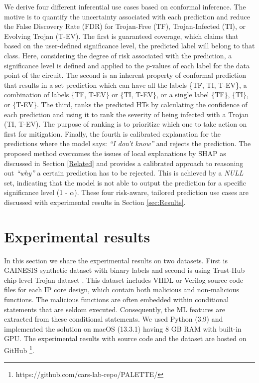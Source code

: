  We derive four different inferential use cases based on conformal inference. The motive is to quantify the uncertainty associated with each prediction and reduce the False Discovery Rate (FDR) for Trojan-Free (TF), Trojan-Infected (TI), or Evolving Trojan (T-EV). The first is guaranteed coverage, which claims that based on the user-defined significance level, the predicted label will belong to that class. Here, considering the degree of risk associated with the prediction, a significance level is defined and applied to the $p$-values of each label for the data point of the circuit. The second is an inherent property of conformal prediction that results in a set prediction which can have all the labels \{TF, TI, T-EV\}, a combination of labels \{TF, T-EV\} or \{TI, T-EV\}, or a single label \{TF\}, \{TI\}, or \{T-EV\}. The third, ranks the predicted HTs by calculating the confidence of each prediction and using it to rank the severity of being infected with a Trojan (TI, T-EV). The purpose of ranking is to prioritize which one to take action on first for mitigation. Finally, the fourth is calibrated explanation for the predictions where the model says: \textit{``I don't know''} and rejects the prediction. The proposed method overcomes the issues of local explanations by SHAP as discussed in Section \ref{Related} and provides a calibrated approach to reasoning out \textit{``why''} a certain prediction has to be rejected. This is achieved by a \textit{NULL} set, indicating that the model is not able to output the prediction for a specific significance level (1 - $\alpha$). These four risk-aware, tailored prediction use cases are discussed with experimental results in Section \ref{sec:Results}.



\section*{Experimental results}
\label{sec:Results}
In this section we share the experimental results on two datasets. First is GAINESIS \cite{liakos2022gainesis} synthetic dataset with binary labels and second is using Trust-Hub chip-level Trojan dataset \cite{px6s-sm21-22}. This dataset includes VHDL or Verilog source code files for each IP core design, which contain both malicious and non-malicious functions. The malicious functions are often embedded within conditional statements that are seldom executed. Consequently, the ML features are extracted from these conditional statements. We used Python (3.9) and implemented the solution on macOS (13.3.1) having 8 GB RAM with built-in GPU. The experimental results with source code and the dataset are hosted on GitHub \footnote{https://github.com/cars-lab-repo/PALETTE/}.

